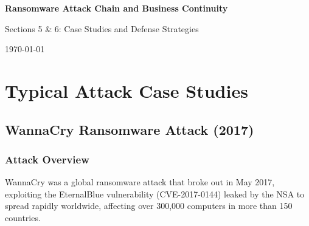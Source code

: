 \documentclass[12pt,a4paper]{article}
\begin{document}
\begin{titlepage}
    \centering
    \vspace*{2cm}
    
    {\Huge\bfseries Ransomware Attack Chain and Business Continuity}
    
    \vspace{1cm}
    {\Large Sections 5 \& 6: Case Studies and Defense Strategies}
    
    \vspace{2cm}
    
    \begin{abstract}
    This document presents detailed analysis of typical ransomware attack case studies and comprehensive organizational defense strategies. Section 5 examines four major ransomware incidents including WannaCry, NotPetya, Colonial Pipeline, and Kaseya attacks, providing technical analysis and impact assessment. Section 6 outlines best practices for organizational defense, covering preventive measures, backup strategies, employee training, incident response, and compliance considerations.
    \end{abstract}
    
    \vspace{3cm}
    
    {\large \today}
    
    \vfill
\end{titlepage}

\newpage
\tableofcontents
\newpage

\section{Typical Attack Case Studies}

\subsection{WannaCry Ransomware Attack (2017)}

\subsubsection{Attack Overview}
WannaCry was a global ransomware attack that broke out in May 2017, exploiting the EternalBlue vulnerability (CVE-2017-0144) leaked by the NSA to spread rapidly worldwide, affecting over 300,000 computers in more than 150 countries.
\end{document}

